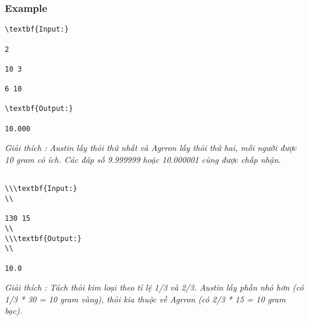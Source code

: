 \subsubsection{   Example  }
\begin{verbatim}
\textbf{Input:}

2

10 3

6 10

\textbf{Output:}

10.000\end{verbatim}

\emph{     Giải thích        : Austin lấy thỏi thứ nhất và Agrron lấy thỏi thứ hai, mỗi người được 10 gram có ích. Các đáp số 9.999999 hoặc 10.000001 cũng được chấp nhận.   }
\begin{verbatim}

\\\textbf{Input:}
\\

130 15
\\
\\\textbf{Output:}
\\

10.0\end{verbatim}

\emph{     Giải thích        : Tách thỏi kim loại theo tỉ lệ 1/3 và 2/3. Austin lấy phần nhỏ hơn (có 1/3 * 30 = 10 gram vàng), thỏi kia thuộc về Agrron (có 2/3 * 15 = 10 gram bạc).   }
